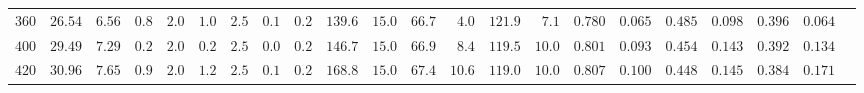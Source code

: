 \documentclass[oldversion]{aa}
\begin{document}
\begin{landscape}
\begin{table}[hbp]
\begin{center}
\begin{tabular}{r r r r r r r r r r r r r r r r r r r r r r}
$   360 $ & $ 26.54 $ & $  6.56 $ & $   0.8 $ & $   2.0 $ & $   1.0 $ & $   2.5 $ & $   0.1 $ & $   0.2 $ & $ 139.6 $  & $  15.0 $ & $  66.7 $ & $   4.0 $ & $ 121.9 $ & $   7.1 $ & $  0.780 $ & $  0.065 $ & $  0.485 $ & $  0.098 $ & $  0.396 $ & $  0.064 $\\
$   400 $ & $ 29.49 $ & $  7.29 $ & $   0.2 $ & $   2.0 $ & $   0.2 $ & $   2.5 $ & $   0.0 $ & $   0.2 $ & $ 146.7 $  & $  15.0 $ & $  66.9 $ & $   8.4 $ & $ 119.5 $ & $  10.0 $ & $  0.801 $ & $  0.093 $ & $  0.454 $ & $  0.143 $ & $  0.392 $ & $  0.134 $\\
$   420 $ & $ 30.96 $ & $  7.65 $ & $   0.9 $ & $   2.0 $ & $   1.2 $ & $   2.5 $ & $   0.1 $ & $   0.2 $ & $ 168.8 $  & $  15.0 $ & $  67.4 $ & $  10.6 $ & $ 119.0 $ & $  10.0 $ & $  0.807 $ & $  0.100 $ & $  0.448 $ & $  0.145 $ & $  0.384 $ & $  0.171 $\\
\hline
\end{tabular}
\end{center}
\end{table}
\end{landscape}
\end{document}
